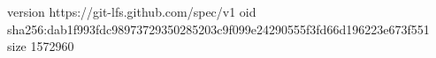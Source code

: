 version https://git-lfs.github.com/spec/v1
oid sha256:dab1f993fdc98973729350285203c9f099e24290555f3fd66d196223e673f551
size 1572960
